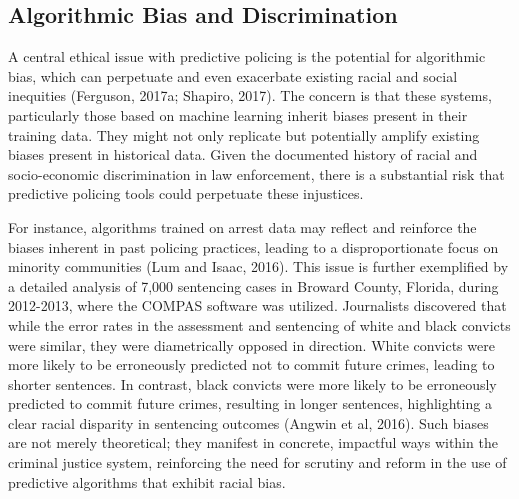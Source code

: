 \documentclass[man, noextraspace]{apa7} %
\begin{document}
 

 

\subsection{Algorithmic Bias and Discrimination}

A central ethical issue with predictive policing is the potential for algorithmic bias, which can perpetuate and even exacerbate existing racial and social inequities (Ferguson, 2017a; Shapiro, 2017). The concern is that these systems, particularly those based on machine learning inherit biases present in their training data. They might not only replicate but potentially amplify existing biases present in historical data. Given the documented history of racial and socio-economic discrimination in law enforcement, there is a substantial risk that predictive policing tools could perpetuate these injustices. 

For instance, algorithms trained on arrest data may reflect and reinforce the biases inherent in past policing practices, leading to a disproportionate focus on minority communities (Lum and Isaac, 2016). This issue is further exemplified by a detailed analysis of 7,000 sentencing cases in Broward County, Florida, during 2012-2013, where the COMPAS software was utilized. Journalists discovered that while the error rates in the assessment and sentencing of white and black convicts were similar, they were diametrically opposed in direction. White convicts were more likely to be erroneously predicted not to commit future crimes, leading to shorter sentences. In contrast, black convicts were more likely to be erroneously predicted to commit future crimes, resulting in longer sentences, highlighting a clear racial disparity in sentencing outcomes (Angwin et al, 2016). Such biases are not merely theoretical; they manifest in concrete, impactful ways within the criminal justice system, reinforcing the need for scrutiny and reform in the use of predictive algorithms that exhibit racial bias.
\end{document}
